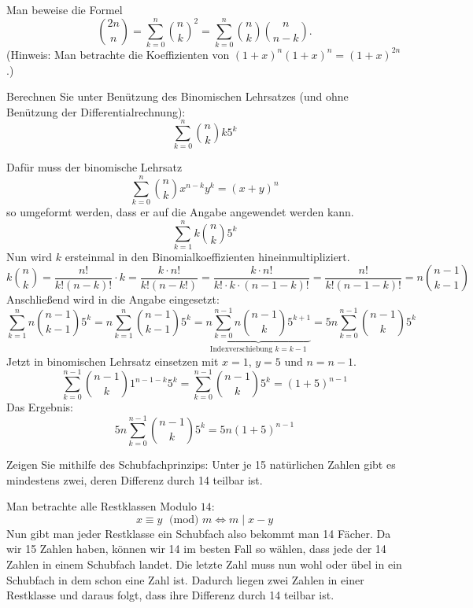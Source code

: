 \documentclass[a4paper, 12pt, margins=2.5cm]{homework}
\begin{document}
  \begin{problem}
    Man beweise die Formel
    \[ \binom{2n}{n} = \sum_{k=0}^n{\binom{n}{k}^2} = \sum_{k=0}^n{\binom{n}{k}\binom{n}{n-k}}. \]
    (Hinweis: Man betrachte die Koeffizienten von $(1+x)^n (1+x)^n = (1+x)^{2n}$.)
  \end{problem}
  \begin{solution}
    
  \end{solution}


  \begin{problem}
    Berechnen Sie unter Benützung des Binomischen Lehrsatzes (und ohne Benützung
    der Differentialrechnung):
    \[ \sum_{k=0}^{n}{\binom{n}{k}k5^k} \]
  \end{problem}
  \begin{solution}
    Dafür muss der binomische Lehrsatz 
    \[ \sum_{k=0}^{n} \binom{n}{k} x^{n-k} y^k = (x+y)^n \]
    so umgeformt werden, dass er auf die Angabe angewendet werden kann.
    \[ \sum_{k=1}^{n}{k \binom{n}{k} 5^k} \]
    Nun wird $k$ ersteinmal in den Binomialkoeffizienten hineinmultipliziert.
    \[  k\binom{n}{k} = \frac{n!}{k!(n-k)!}\cdot k = \frac{k\cdot n!}{k!(n-k!)} = 
        \frac{k\cdot n!}{k!\cdot k\cdot (n-1-k)!} = \frac{n!}{k!(n-1-k)!} =
        n\binom{n-1}{k-1}
    \]
    Anschließend wird in die Angabe eingesetzt:
    \[
      \sum_{k=1}^{n}{n\binom{n-1}{k-1} 5^k} = n\sum_{k=1}^{n}{\binom{n-1}{k-1} 5^k} =
      \underbrace{n\sum_{k=0}^{n-1}{n\binom{n-1}{k} 5^{k+1}}}_\text{Indexverschiebung $k=k-1$} = 5n\sum_{k=0}^{n-1}{\binom{n-1}{k} 5^k}
    \]
    Jetzt in binomischen Lehrsatz einsetzen mit $x=1$, $y=5$ und $n=n-1$.
    \[
      \sum_{k=0}^{n-1}{\binom{n-1}{k} 1^{n-1-k} 5^k} = \sum_{k=0}^{n-1}{\binom{n-1}{k} 5^k} =
      (1+5)^{n-1}
    \]
    Das Ergebnis:
    \[ 5n\sum_{k=0}^{n-1}{\binom{n-1}{k} 5^k} = 5n (1+5)^{n-1} \]

  \end{solution}


  \begin{problem}
    Zeigen Sie mithilfe des Schubfachprinzips: Unter je 15 natürlichen Zahlen
    gibt es mindestens zwei, deren Differenz durch 14 teilbar ist.
  \end{problem}
  \begin{solution}
    Man betrachte alle Restklassen Modulo $14$:
    \[ x \equiv y\; \text{ (mod) }m \Leftrightarrow m\; |\; x-y \]
    Nun gibt man jeder Restklasse ein Schubfach also bekommt man 14 Fächer. Da
    wir 15 Zahlen haben, können wir 14 im besten Fall so wählen, dass jede der 
    14 Zahlen in einem Schubfach landet. Die letzte Zahl muss nun wohl oder übel
    in ein Schubfach in dem schon eine Zahl ist. Dadurch liegen zwei Zahlen in
    einer Restklasse und daraus folgt, dass ihre Differenz durch 14 teilbar ist.
  \end{solution}
\end{document}
